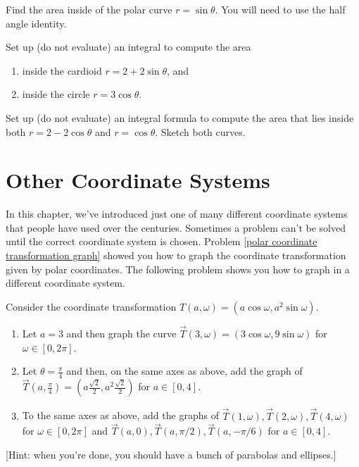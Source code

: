 \begin{problem} 
Find the area inside of the polar curve $r=\sin\theta$. You will need to use the half angle identity. 
\end{problem}


\begin{problem}
Set up (do not evaluate) an integral to compute the area 
\begin{enumerate}
\item inside the cardioid $r=2+2\sin\theta$, and
\item inside the circle $r=3\cos\theta$.
\end{enumerate}
\end{problem}

\begin{problem}
Set up (do not evaluate) an integral formula to compute the area that lies inside both $r=2-2\cos\theta$ and $r=\cos\theta$. Sketch both curves. 
\end{problem}


\section{Other Coordinate Systems}
In this chapter, we've introduced just one of many different coordinate systems that people have used over the centuries. Sometimes a problem can't be solved until the correct coordinate system is chosen. Problem \ref{polar coordinate transformation graph} showed you how to graph the coordinate transformation given by polar coordinates.  The following problem shows you how to graph in a different coordinate system.

\begin{problem}
Consider the coordinate transformation $T(a,\omega)=(a\cos\omega,a^2\sin \omega)$.
\begin{enumerate}
\item{}%
 Let $a=3$ and then graph the curve $\vec T(3,\omega)=(3\cos\omega,9\sin\omega)$ for $\omega\in[0,2\pi]$.
\item{}%
 Let $\theta=\frac{\pi}{4}$ and then, on the same axes as above, add the graph of 
$\vec T\left(a,\frac{\pi}{4}\right)=\left(a\frac{\sqrt 2}{2},a^2 \frac{\sqrt 2}{2}\right)$ for $a\in[0,4]$.
\item{}To the same axes as above, add the graphs of 
$\vec T(1,\omega), \vec T(2,\omega), \vec T(4,\omega)$  for $\omega\in[0,2\pi]$ and 
$\vec T(a,0), \vec T(a,\pi/2), \vec T(a,-\pi/6)$ for $a\in[0,4]$. 
\end{enumerate}
[Hint: when you're done, you should have a bunch of parabolas and ellipses.]
\end{problem}


